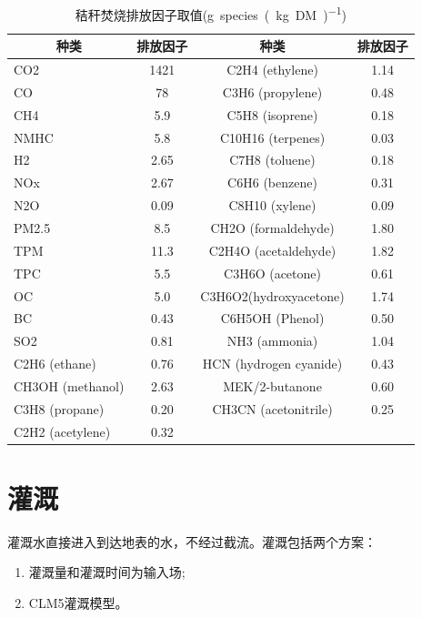 \begin{table}[htbp]
  \centering
  \caption{秸秆焚烧排放因子取值(\unit{g.species.(kg.DM)^{-1}})}
  \label{tab:秸秆焚烧排放因子取值}
  \begin{tabular}{@{}lccc@{}}
  \toprule
  \multicolumn{1}{c}{种类} & 排放因子 & 种类                     & 排放因子 \\ \midrule
  CO2                    & 1421 & C2H4   (ethylene)      & 1.14 \\
  CO                     & 78   & C3H6   (propylene)     & 0.48 \\
  CH4                    & 5.9  & C5H8   (isoprene)      & 0.18 \\
  NMHC                   & 5.8  & C10H16   (terpenes)    & 0.03 \\
  H2                     & 2.65 & C7H8   (toluene)       & 0.18 \\
  NOx                    & 2.67 & C6H6   (benzene)       & 0.31 \\
  N2O                    & 0.09 & C8H10   (xylene)       & 0.09 \\
  PM2.5                  & 8.5  & CH2O   (formaldehyde)  & 1.80 \\
  TPM                    & 11.3 & C2H4O   (acetaldehyde) & 1.82 \\
  TPC                    & 5.5  & C3H6O   (acetone)      & 0.61 \\
  OC                     & 5.0  & C3H6O2(hydroxyacetone) & 1.74 \\
  BC                     & 0.43 & C6H5OH   (Phenol)      & 0.50 \\
  SO2                    & 0.81 & NH3 (ammonia)          & 1.04 \\
  C2H6   (ethane)        & 0.76 & HCN (hydrogen cyanide) & 0.43 \\
  CH3OH   (methanol)     & 2.63 & MEK/2-butanone         & 0.60 \\
  C3H8   (propane)       & 0.20 & CH3CN   (acetonitrile) & 0.25 \\
  C2H2   (acetylene)     & 0.32 &                        &      \\ \bottomrule
  \end{tabular}
  \end{table}


\section{灌溉}
灌溉水直接进入到达地表的水，不经过截流。灌溉包括两个方案：
\begin{enumerate}
  \item 灌溉量和灌溉时间为输入场;
  \item CLM5灌溉模型。
\end{enumerate}
